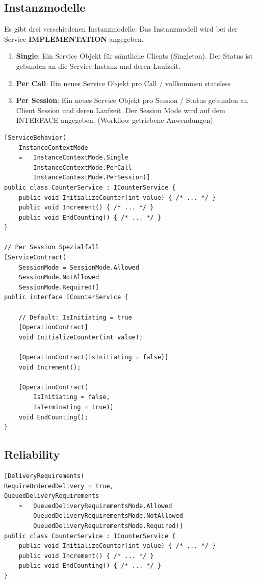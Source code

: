 \clearpage

\subsection{Instanzmodelle}
Es gibt drei verschiedenen Instanzmodelle. Das Instanzmodell wird bei der Service \textbf{IMPLEMENTATION} angegeben.
\begin{enumerate}
	\item \textbf{Single}: Ein Service Objekt für sämtliche Clients (Singleton). Der Status ist gebunden an die Service Instanz und deren Laufzeit. 
	\item \textbf{Per Call}: Ein neues Service Objekt pro Call / vollkommen stateless 
	\item \textbf{Per Session}: Ein neues Service Objekt pro Session / Status gebunden an Client Session und deren Laufzeit. Der Session Mode wird auf dem INTERFACE angegeben. (Workflow getriebene Anwendungen)
\end{enumerate}

\begin{lstlisting}[caption=Instanzmodelle]
[ServiceBehavior(
	InstanceContextMode
	= 	InstanceContextMode.Single
		InstanceContextMode.PerCall
		InstanceContextMode.PerSession)]
public class CounterService : ICounterService {
	public void InitializeCounter(int value) { /* ... */ }
	public void Increment() { /* ... */ }
	public void EndCounting() { /* ... */ }
}

// Per Session Spezialfall
[ServiceContract(
	SessionMode = SessionMode.Allowed
	SessionMode.NotAllowed
	SessionMode.Required)]
public interface ICounterService {

	// Default: IsInitiating = true
	[OperationContract] 
	void InitializeCounter(int value);

	[OperationContract(IsInitiating = false)]
	void Increment();

	[OperationContract(
		IsInitiating = false,
		IsTerminating = true)]
	void EndCounting();
}
\end{lstlisting}

\clearpage

\subsection{Reliability}
\begin{lstlisting}[caption=WCF Reliability]
[DeliveryRequirements(
RequireOrderedDelivery = true,
QueuedDeliveryRequirements
	= 	QueuedDeliveryRequirementsMode.Allowed
		QueuedDeliveryRequirementsMode.NotAllowed
		QueuedDeliveryRequirementsMode.Required)]
public class CounterService : ICounterService {
	public void InitializeCounter(int value) { /* ... */ }
	public void Increment() { /* ... */ }
	public void EndCounting() { /* ... */ }
}
\end{lstlisting}

